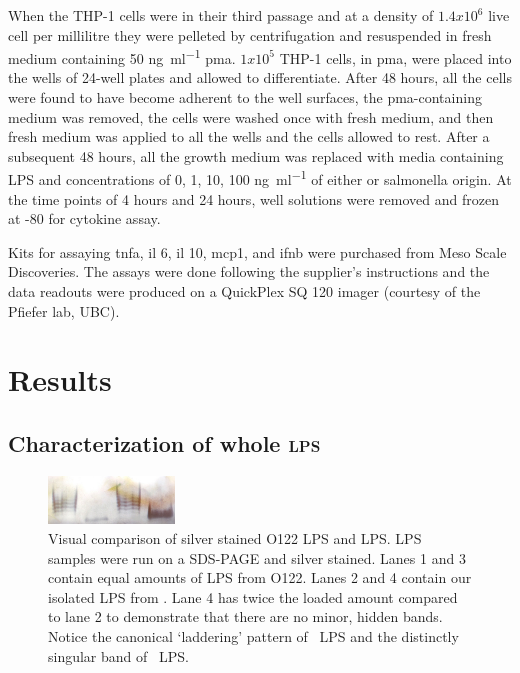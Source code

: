      When the THP-1 cells were in their third passage and at a density of $1.4x10^{6}$ live cell per millilitre they were pelleted by centrifugation and resuspended in fresh medium containing 50 \si{\nano\gram\per\milli\litre} \ac{pma}. $1x10^{5}$ THP-1 cells, in \ac{pma}, were placed into the wells of 24-well plates and allowed to differentiate. After 48 hours, all the cells were found to have become adherent to the well surfaces, the \ac{pma}-containing medium was removed, the cells were washed once with fresh medium, and then fresh medium was applied to all the wells and the cells allowed to rest. After a subsequent 48 hours, all the growth medium was replaced with media containing \ac{LPS} and concentrations of 0, 1, 10, 100 \si{\nano\gram\per\milli\litre} of either \caulobacter{} or \ac{salmonella} origin. At the time points of 4 hours and 24 hours, well solutions were removed and frozen at -80\cel{} for cytokine assay.
      
      Kits for assaying \ac{tnfa}, \ac{il} 6, \ac{il} 10, \ac{mcp1}, and \ac{ifnb} were purchased from Meso Scale Discoveries. The assays were done following the supplier's instructions and the data readouts were produced on a QuickPlex SQ 120 imager (courtesy of the Pfiefer lab, UBC).
    
      \section{Results} %
      \label{sec:lps_results}
      \subsection{Characterization of whole \textsc{lps}} %
      \label{sub:characterisation_of_whole_lps}
      \begin{figure}[htb]
        \begin{center}
          \includegraphics[width=0.3\textwidth]{lps_chapter/img/lpssilverstain.jpg}
        \end{center}
        \caption[Visual comparison of \ecoli O122 \ac{LPS} and \caulobacter \ac{LPS}]{Visual comparison
          of silver stained \ecoli O122 \ac{LPS} and \caulobacter \ac{LPS}. \ac{LPS} samples were run on
          a \ac{SDS-PAGE} and silver stained. Lanes 1 and 3 contain equal amounts of \ac{LPS} from
          \ecoli O122. Lanes 2 and 4 contain our isolated \ac{LPS} from \caulobacter. Lane 4 has twice
          the loaded amount compared to lane 2 to demonstrate that there are no minor, hidden
          bands. Notice the canonical `laddering' pattern of \ecoli\ \ac{LPS} and the distinctly
          singular band of \caulobacter\ \ac{LPS}.}
        \label{fig:lpssilverstain}
      \end{figure}

